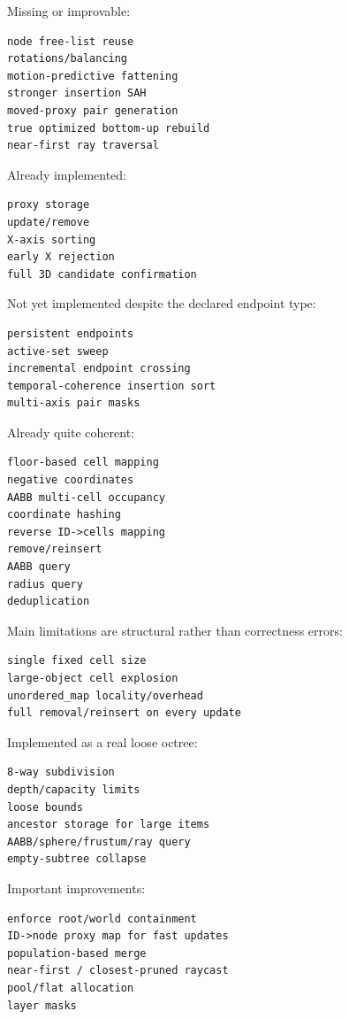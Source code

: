 Missing or improvable:

\begin{verbatim}
node free-list reuse
rotations/balancing
motion-predictive fattening
stronger insertion SAH
moved-proxy pair generation
true optimized bottom-up rebuild
near-first ray traversal
\end{verbatim}

\textbf{}

Already implemented:

\begin{verbatim}
proxy storage
update/remove
X-axis sorting
early X rejection
full 3D candidate confirmation
\end{verbatim}

Not yet implemented despite the declared endpoint type:

\begin{verbatim}
persistent endpoints
active-set sweep
incremental endpoint crossing
temporal-coherence insertion sort
multi-axis pair masks
\end{verbatim}

\textbf{}

Already quite coherent:

\begin{verbatim}
floor-based cell mapping
negative coordinates
AABB multi-cell occupancy
coordinate hashing
reverse ID->cells mapping
remove/reinsert
AABB query
radius query
deduplication
\end{verbatim}

Main limitations are structural rather than correctness errors:

\begin{verbatim}
single fixed cell size
large-object cell explosion
unordered_map locality/overhead
full removal/reinsert on every update
\end{verbatim}

\textbf{}

Implemented as a real loose octree:

\begin{verbatim}
8-way subdivision
depth/capacity limits
loose bounds
ancestor storage for large items
AABB/sphere/frustum/ray query
empty-subtree collapse
\end{verbatim}

Important improvements:

\begin{verbatim}
enforce root/world containment
ID->node proxy map for fast updates
population-based merge
near-first / closest-pruned raycast
pool/flat allocation
layer masks
\end{verbatim}

